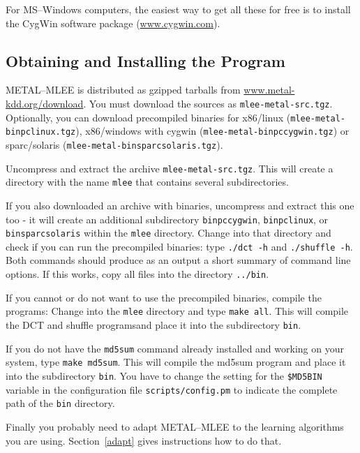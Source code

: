 \documentclass[a4paper,10pt,twoside]{article}
\newcommand{\eenameshort}{\textsf{METAL--MLEE}}
\begin{document}
For MS--Windows computers,
the easiest way to get all these for free is to install the
CygWin software package (\url{www.cygwin.com}).

\subsection{Obtaining and Installing the Program}

\eenameshort{} is distributed as  gzipped tarballs 
from \url{www.metal-kdd.org/download}. 
You must download the sources as  \texttt{mlee-metal-src.tgz}.
Optionally, you can download precompiled binaries for
x86/linux (\texttt{mlee-metal-binpclinux.tgz}), 
x86/windows with cygwin (\texttt{mlee-metal-binpccygwin.tgz}) or
sparc/solaris (\texttt{mlee-metal-binsparcsolaris.tgz}).

Uncompress and extract the archive \texttt{mlee-metal-src.tgz}.
This will create a directory with the name \texttt{mlee} that
contains several subdirectories. 

If you also downloaded an archive with binaries, uncompress and
extract this one too - it will create an additional subdirectory
\texttt{binpccygwin}, \texttt{binpclinux}, or \texttt{binsparcsolaris}
within the \texttt{mlee} directory.
Change into that directory and check if you can run the precompiled
binaries:
type \texttt{./dct -h} and \texttt{./shuffle -h}. Both commands
should produce as an output a short summary of command line 
options. If this works, copy all files into the directory \texttt{../bin}.

If you cannot or do not want to use the precompiled binaries,
 compile the programs: 
Change into the \texttt{mlee} directory and type \texttt{make all}. This 
will compile the DCT and shuffle programsand place it into the 
subdirectory \texttt{bin}.

If you do not have the \texttt{md5sum} command already installed 
and working on your system, type \texttt{make md5sum}. This will
compile the md5sum program and place it into the subdirectory \texttt{bin}.
You have to change the setting for the \texttt{\$MD5BIN} variable in
the configuration file \texttt{scripts/config.pm} to indicate
the complete path of the \texttt{bin} directory.


Finally you probably need to adapt \eenameshort{} to the learning
algorithms you are using. Section~\ref{adapt} gives instructions how
to do that. 
\end{document}
